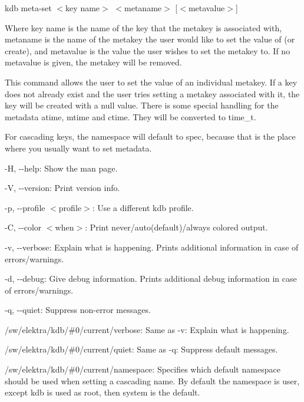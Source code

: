 {\ttfamily kdb meta-\/set $<$key name$>$ $<$metaname$>$ \mbox{[}$<$metavalue$>$\mbox{]}}

Where {\ttfamily key name} is the name of the key that the metakey is associated with, {\ttfamily metaname} is the name of the metakey the user would like to set the value of (or create), and {\ttfamily metavalue} is the value the user wishes to set the metakey to. If no {\ttfamily metavalue} is given, the metakey will be removed.

This command allows the user to set the value of an individual metakey. If a key does not already exist and the user tries setting a metakey associated with it, the key will be created with a null value. There is some special handling for the metadata atime, mtime and ctime. They will be converted to time\+\_\+t.

For cascading keys, the namespace will default to {\ttfamily spec}, because that is the place where you usually want to set metadata.


\begin{DoxyItemize}
\item {\ttfamily -\/H}, {\ttfamily -\/-\/help}\+: Show the man page.
\item {\ttfamily -\/V}, {\ttfamily -\/-\/version}\+: Print version info.
\item {\ttfamily -\/p}, {\ttfamily -\/-\/profile $<$profile$>$}\+: Use a different kdb profile.
\item {\ttfamily -\/C}, {\ttfamily -\/-\/color $<$when$>$}\+: Print never/auto(default)/always colored output.
\item {\ttfamily -\/v}, {\ttfamily -\/-\/verbose}\+: Explain what is happening. Prints additional information in case of errors/warnings.
\item {\ttfamily -\/d}, {\ttfamily -\/-\/debug}\+: Give debug information. Prints additional debug information in case of errors/warnings.
\item {\ttfamily -\/q}, {\ttfamily -\/-\/quiet}\+: Suppress non-\/error messages.
\end{DoxyItemize}


\begin{DoxyItemize}
\item {\ttfamily /sw/elektra/kdb/\#0/current/verbose}\+: Same as {\ttfamily -\/v}\+: Explain what is happening.
\item {\ttfamily /sw/elektra/kdb/\#0/current/quiet}\+: Same as {\ttfamily -\/q}\+: Suppress default messages.
\item {\ttfamily /sw/elektra/kdb/\#0/current/namespace}\+: Specifies which default namespace should be used when setting a cascading name. By default the namespace is {\ttfamily user}, except {\ttfamily kdb} is used as root, then {\ttfamily system} is the default.
\end{DoxyItemize}


